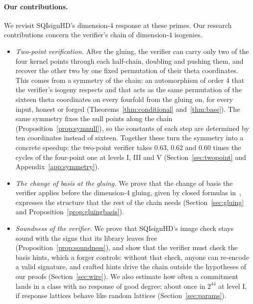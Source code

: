 \documentclass[version=preprint]{iacrcc}
\begin{document}
    \paragraph{Our contributions.}
    We revisit SQIsignHD's dimension-4 response at these primes. Our research
    contributions concern the verifier's chain of dimension-4 isogenies.
    \begin{itemize}
        \item \emph{Two-point verification.} After the gluing, the verifier
        can carry only two of the four kernel points through each half-chain,
        doubling and pushing them, and recover the other two by one fixed
        permutation of their theta coordinates. This comes from a symmetry of
        the chain: an automorphism of order 4 that the verifier's isogeny
        respects and that acts as the same permutation of the sixteen theta
        coordinates on every fourfold from the gluing on, for every input,
        honest or forged (Theorems~\ref{thm:conditional}
        and~\ref{thm:base}). The same symmetry fixes the null points along the
        chain (Proposition~\ref{prop:symnull}), so the constants of each step
        are determined by ten coordinates instead of sixteen. Together these
        turn the symmetry into a concrete speedup: the two-point verifier takes
        0.63, 0.62 and 0.60 times the cycles of the four-point one at levels I,
        III and V (Section~\ref{sec:twopoint} and
        Appendix~\ref{app:symmetry}).
        \item \emph{The change of basis at the gluing.} We prove that the
        change of basis the verifier applies before the dimension-4 gluing,
        given by closed formulas in~\cite{Dar24}, expresses the structure that
        the rest of the chain needs (Section~\ref{sec:gluing} and
        Proposition~\ref{prop:gluingbasis}).
        \item \emph{Soundness of the verifier.} We prove that SQIsignHD's
        image check stays sound with the signs that its library leaves free
        (Proposition~\ref{prop:soundness}), and show that the verifier must
        check the basis hints, which a forger controls: without that check,
        anyone can re-encode a valid signature, and crafted hints drive the
        chain outside the hypotheses of our proofs (Section~\ref{sec:wire}). We
        also estimate how often a commitment lands in a class with no response
        of good degree: about once in $2^{44}$ at level I, if response lattices
        behave like random lattices (Section~\ref{sec:params}).
    \end{itemize}
\end{document}
